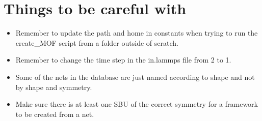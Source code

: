 \documentclass[11pt,letterpaper]{report}
\begin{document}
	\chapter{Things to be careful with}
	\begin{itemize}
		\item Remember to update the path and home in constants when trying to run the create\_MOF script from a folder outside of scratch.
		
		\item Remember to change the time step in the in.lammps file from 2 to 1.
		
		\item Some of the nets in the database are just named according to shape and not by shape and symmetry. 
		
		\item Make sure there is at least one SBU of the correct symmetry for a framework to be created from a net. 
	\end{itemize}
	
	
	
	
	
	
\end{document}

